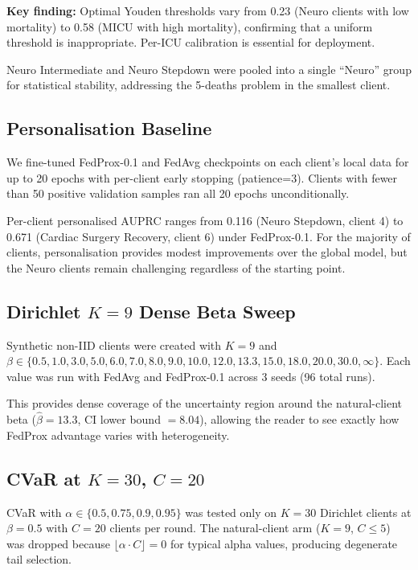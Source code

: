 \textbf{Key finding:} Optimal Youden thresholds vary from 0.23 (Neuro clients with low mortality) to 0.58 (MICU with high mortality), confirming that a uniform threshold is inappropriate. Per-ICU calibration is essential for deployment.

Neuro Intermediate and Neuro Stepdown were pooled into a single ``Neuro'' group for statistical stability, addressing the 5-deaths problem in the smallest client.

\subsection{Personalisation Baseline}
\label{sec:personalisation}

We fine-tuned FedProx-0.1 and FedAvg checkpoints on each client's local data for up to 20 epochs with per-client early stopping (patience=3). Clients with fewer than 50 positive validation samples ran all 20 epochs unconditionally.

Per-client personalised AUPRC ranges from 0.116 (Neuro Stepdown, client 4) to 0.671 (Cardiac Surgery Recovery, client 6) under FedProx-0.1. For the majority of clients, personalisation provides modest improvements over the global model, but the Neuro clients remain challenging regardless of the starting point.

\subsection{Dirichlet $K=9$ Dense Beta Sweep}
\label{sec:dirichlet-k9}

Synthetic non-IID clients were created with $K=9$ and $\beta \in \{0.5, 1.0, 3.0, 5.0, 6.0, 7.0, 8.0, 9.0, 10.0, 12.0, 13.3, 15.0, 18.0, 20.0, 30.0, \infty\}$. Each value was run with FedAvg and FedProx-0.1 across 3 seeds (96 total runs).

This provides dense coverage of the uncertainty region around the natural-client beta ($\hat{\beta}=13.3$, CI lower bound $=8.04$), allowing the reader to see exactly how FedProx advantage varies with heterogeneity.

\subsection{CVaR at $K=30$, $C=20$}
\label{sec:cvar-k30}

CVaR with $\alpha \in \{0.5, 0.75, 0.9, 0.95\}$ was tested only on $K=30$ Dirichlet clients at $\beta=0.5$ with $C=20$ clients per round. The natural-client arm ($K=9$, $C \le 5$) was dropped because $\lfloor \alpha \cdot C \rfloor = 0$ for typical alpha values, producing degenerate tail selection.


